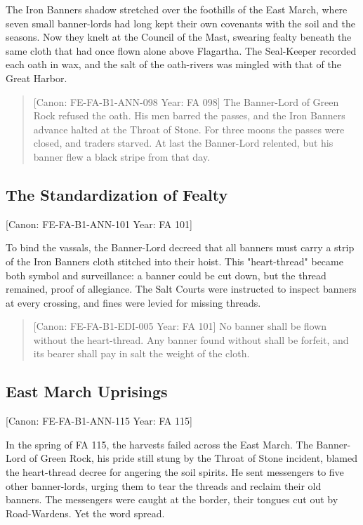 The Iron Banner\textquotesingle s shadow stretched over the foothills of
the East March, where seven small banner-lords had long kept their own
covenants with the soil and the seasons. Now they knelt at the Council
of the Mast, swearing fealty beneath the same cloth that had once flown
alone above Flagartha. The Seal-Keeper recorded each oath in wax, and
the salt of the oath-rivers was mingled with that of the Great Harbor.

\begin{quote}
{[}Canon: FE-FA-B1-ANN-098 \textbar{} Year: FA 098{]} The Banner-Lord of
Green Rock refused the oath. His men barred the passes, and the Iron
Banner\textquotesingle s advance halted at the Throat of Stone. For
three moons the passes were closed, and traders starved. At last the
Banner-Lord relented, but his banner flew a black stripe from that day.
\end{quote}

\subsection{The Standardization of
Fealty}\label{the-standardization-of-fealty}

{[}Canon: FE-FA-B1-ANN-101 \textbar{} Year: FA 101{]}

To bind the vassals, the Banner-Lord decreed that all banners must carry
a strip of the Iron Banner\textquotesingle s cloth stitched into their
hoist. This "heart-thread" became both symbol and surveillance: a banner
could be cut down, but the thread remained, proof of allegiance. The
Salt Courts were instructed to inspect banners at every crossing, and
fines were levied for missing threads.

\begin{quote}
{[}Canon: FE-FA-B1-EDI-005 \textbar{} Year: FA 101{]} No banner shall be
flown without the heart-thread. Any banner found without shall be
forfeit, and its bearer shall pay in salt the weight of the cloth.
\end{quote}

\subsection{East March Uprisings}\label{east-march-uprisings}

{[}Canon: FE-FA-B1-ANN-115 \textbar{} Year: FA 115{]}

In the spring of FA 115, the harvests failed across the East March. The
Banner-Lord of Green Rock, his pride still stung by the Throat of Stone
incident, blamed the heart-thread decree for angering the soil spirits.
He sent messengers to five other banner-lords, urging them to tear the
threads and reclaim their old banners. The messengers were caught at the
border, their tongues cut out by Road-Wardens. Yet the word spread.

